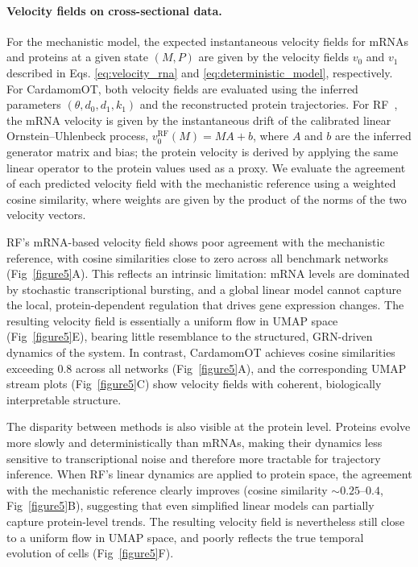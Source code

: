 \documentclass[a4paper, 11pt]{article}
\theoremstyle{plain}
\theoremstyle{remark}
\begin{document}
\paragraph{Velocity fields on cross-sectional data.}
For the mechanistic model, the expected instantaneous velocity fields for mRNAs and
proteins at a given state $(M, P)$ are given by the velocity fields $v_0$ and $v_1$ described in Eqs. \eqref{eq:velocity_rna} and \eqref{eq:deterministic_model}, respectively. For CardamomOT, both velocity fields are evaluated using the inferred parameters
$(\theta, d_0, d_1, k_1)$ and the reconstructed protein trajectories.
For RF~\cite{zhang2024joint}, the mRNA velocity is given by the instantaneous drift
of the calibrated linear Ornstein–Uhlenbeck process,
$v_0^{\mathrm{RF}}(M) = MA + b$,
where $A$ and $b$ are the inferred generator matrix and bias; the protein velocity is
derived by applying the same linear operator to the protein values used as a proxy.
We evaluate the agreement of each predicted velocity field with the mechanistic reference
using a weighted cosine similarity, where weights are given by the product of the norms of the two
velocity vectors.

RF's mRNA-based velocity field shows poor agreement with the mechanistic reference,
with cosine similarities close to zero across all benchmark networks
(Fig~\ref{figure5}A). This reflects an intrinsic limitation: mRNA levels
are dominated by stochastic transcriptional bursting, and a global linear model cannot
capture the local, protein-dependent regulation that drives gene expression changes.
The resulting velocity field is essentially a uniform flow in UMAP space
(Fig~\ref{figure5}E), bearing little resemblance to the structured, GRN-driven dynamics
of the system. In contrast, CardamomOT achieves cosine similarities exceeding $0.8$
across all networks (Fig~\ref{figure5}A), and the corresponding UMAP stream plots
(Fig~\ref{figure5}C) show velocity fields with coherent, biologically interpretable
structure.

The disparity between methods is also visible at the protein level. Proteins evolve
more slowly and deterministically than mRNAs, making their dynamics less sensitive to
transcriptional noise and therefore more tractable for trajectory inference.
When RF's linear dynamics are applied to protein space, the agreement with the mechanistic
reference clearly improves (cosine similarity $\sim 0.25$--$0.4$,
Fig~\ref{figure5}B), suggesting that even simplified linear models can partially capture
protein-level trends. The resulting velocity field is nevertheless still close to a uniform flow in UMAP space, and poorly reflects the true temporal evolution of cells (Fig~\ref{figure5}F). 
\end{document}

